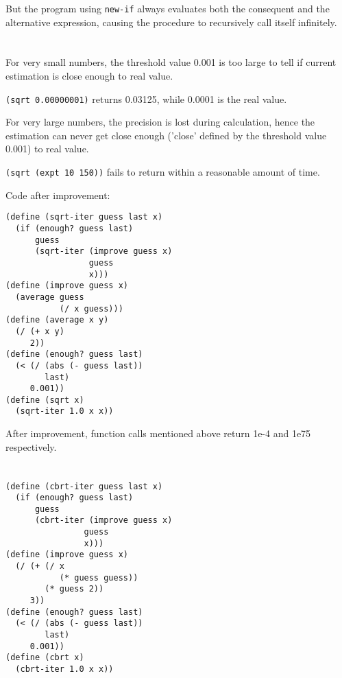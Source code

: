 \documentclass[../main.tex]{subfiles}
\begin{document}
But the program using \lstinline{new-if} always evaluates both the consequent and the alternative expression, causing the procedure to recursively call itself infinitely.


\section{}

For very small numbers, the threshold value 0.001 is too large to tell if current estimation is close enough to real value.

\lstinline{(sqrt 0.00000001)} returns 0.03125, while 0.0001 is the real value.

For very large numbers, the precision is lost during calculation, hence the estimation can never get close enough ('close' defined by the threshold value 0.001) to real value.

\lstinline{(sqrt (expt 10 150))} fails to return within a reasonable amount of time.

Code after improvement:

\begin{lstlisting}
(define (sqrt-iter guess last x)
  (if (enough? guess last)
      guess
      (sqrt-iter (improve guess x)
                 guess
                 x)))
(define (improve guess x)
  (average guess
           (/ x guess)))
(define (average x y)
  (/ (+ x y)
     2))
(define (enough? guess last)
  (< (/ (abs (- guess last))
        last)
     0.001))
(define (sqrt x)
  (sqrt-iter 1.0 x x))
\end{lstlisting}

After improvement, function calls mentioned above return 1e-4 and 1e75 respectively.


\section{}

\begin{lstlisting}
(define (cbrt-iter guess last x)
  (if (enough? guess last)
      guess
      (cbrt-iter (improve guess x)
                guess
                x)))
(define (improve guess x)
  (/ (+ (/ x
           (* guess guess))
        (* guess 2))
     3))
(define (enough? guess last)
  (< (/ (abs (- guess last))
        last)
     0.001))
(define (cbrt x)
  (cbrt-iter 1.0 x x))
\end{lstlisting}
\end{document}
